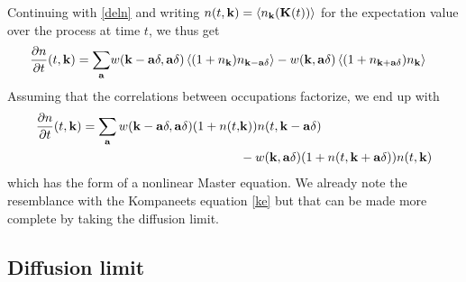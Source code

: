 \documentclass[a4paper,12pt,reqno,superscriptaddress,nofootinbib]{revtex4}
\newcommand{\0}{^{(0)}}
\newcommand{\1}{^{(1)}}
\newcommand{\2}{^{(2)}}
\begin{document}
Continuing with \eqref{deln} and writing $n(t,\vb{k}) = \left\langle n_{\vb{k}}(\vb{K}(t)) \right\rangle$ for the expectation value over the process at time $t$, we thus get
\begin{align*}
{\pdv{n}{t}} (t,\vb{k}) = \sum_{\vb{a}}&  w(\vb{k} - \vb{a} \delta, \vb{a}\delta) 
\left\langle (1 + n_{\vb{k}} ) n_{\vb{k} - \vb{a}\delta} \right\rangle 
-  w(\vb{k}, \vb{a}\delta) \left\langle (1 + n_{\vb{k}+\vb{a} \delta} ) 
n_{\vb{k}} \right\rangle
\end{align*}
Assuming that the correlations between occupations factorize, we end up with
\begin{align}
{\pdv{n}{t} }(t,\vb{k}) 
= \sum_{\vb{a}}  w(\vb{k} - \vb{a} \delta, \vb{a}\delta) (1 
+ n(t,&\vb{k})) n(t,\vb{k} - \vb{a}\delta) \nonumber \\
&-  w(\vb{k}, \vb{a}\delta) (1 + n(t,\vb{k}+\vb{a} \delta)) n(t,\vb{k})
\end{align}
which has the form of a nonlinear Master equation.  We already note the resemblance with the Kompaneets equation \eqref{ke} but that can be made more complete by taking the diffusion limit.

\subsection{Diffusion limit}
\end{document}

